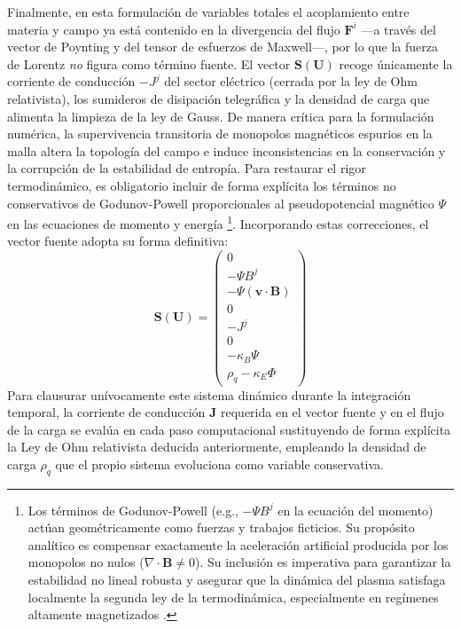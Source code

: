 Finalmente, en esta formulación de variables totales el acoplamiento entre materia y campo ya está contenido en la divergencia del flujo $\mathbf{F}^i$ ---a través del vector de Poynting y del tensor de esfuerzos de Maxwell---, por lo que la fuerza de Lorentz \emph{no} figura como término fuente. El vector $\mathbf{S}(\mathbf{U})$ recoge únicamente la corriente de conducción $-J^j$ del sector eléctrico (cerrada por la ley de Ohm relativista), los sumideros de disipación telegráfica y la densidad de carga que alimenta la limpieza de la ley de Gauss. De manera crítica para la formulación numérica, la supervivencia transitoria de monopolos magnéticos espurios en la malla altera la topología del campo e induce inconsistencias en la conservación y la corrupción de la estabilidad de entropía. Para restaurar el rigor termodinámico, es obligatorio incluir de forma explícita los términos no conservativos de Godunov-Powell proporcionales al pseudopotencial magnético $\Psi$ en las ecuaciones de momento y energía \parencite{ruedaramirez2023}\footnote{Los términos de Godunov-Powell (e.g., $-\Psi B^j$ en la ecuación del momento) actúan geométricamente como fuerzas y trabajos ficticios. Su propósito analítico es compensar exactamente la aceleración artificial producida por los monopolos no nulos ($\nabla \cdot \mathbf{B} \neq 0$). Su inclusión es imperativa para garantizar la estabilidad no lineal robusta y asegurar que la dinámica del plasma satisfaga localmente la segunda ley de la termodinámica, especialmente en regímenes altamente magnetizados \parencite{ruedaramirez2023}.}. Incorporando estas correcciones, el vector fuente adopta su forma definitiva:
\begin{equation}
    \mathbf{S}(\mathbf{U}) =
    \begin{pmatrix}
        0 \\
        - \Psi B^j \\
        - \Psi (\mathbf{v} \cdot \mathbf{B}) \\
        0 \\
        -J^j \\
        0 \\
        -\kappa_B \Psi \\
        \rho_q - \kappa_E \Phi
    \end{pmatrix}
\end{equation}
Para clausurar unívocamente este sistema dinámico durante la integración temporal, la corriente de conducción $\mathbf{J}$ requerida en el vector fuente y en el flujo de la carga se evalúa en cada paso computacional sustituyendo de forma explícita la Ley de Ohm relativista deducida anteriormente, empleando la densidad de carga $\rho_q$ que el propio sistema evoluciona como variable conservativa.

